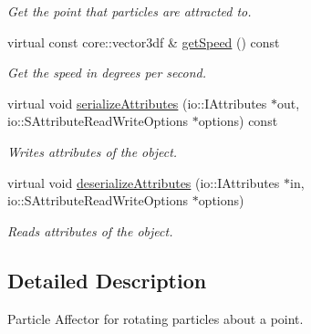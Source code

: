 \begin{DoxyCompactItemize}
\begin{DoxyCompactList}\small\item\em Get the point that particles are attracted to. \end{DoxyCompactList}\item 
\hypertarget{classirr_1_1scene_1_1_c_particle_rotation_affector_ac51ab21cec4c10127ccd55c367d94489}{virtual const core\-::vector3df \& \hyperlink{classirr_1_1scene_1_1_c_particle_rotation_affector_ac51ab21cec4c10127ccd55c367d94489}{get\-Speed} () const }\label{classirr_1_1scene_1_1_c_particle_rotation_affector_ac51ab21cec4c10127ccd55c367d94489}

\begin{DoxyCompactList}\small\item\em Get the speed in degrees per second. \end{DoxyCompactList}\item 
\hypertarget{classirr_1_1scene_1_1_c_particle_rotation_affector_a8244124763ba17bcbc81b1f0e0b49fee}{virtual void \hyperlink{classirr_1_1scene_1_1_c_particle_rotation_affector_a8244124763ba17bcbc81b1f0e0b49fee}{serialize\-Attributes} (io\-::\-I\-Attributes $\ast$out, io\-::\-S\-Attribute\-Read\-Write\-Options $\ast$options) const }\label{classirr_1_1scene_1_1_c_particle_rotation_affector_a8244124763ba17bcbc81b1f0e0b49fee}

\begin{DoxyCompactList}\small\item\em Writes attributes of the object. \end{DoxyCompactList}\item 
\hypertarget{classirr_1_1scene_1_1_c_particle_rotation_affector_aa5590dd4b82741a776c8d2cd639bd53d}{virtual void \hyperlink{classirr_1_1scene_1_1_c_particle_rotation_affector_aa5590dd4b82741a776c8d2cd639bd53d}{deserialize\-Attributes} (io\-::\-I\-Attributes $\ast$in, io\-::\-S\-Attribute\-Read\-Write\-Options $\ast$options)}\label{classirr_1_1scene_1_1_c_particle_rotation_affector_aa5590dd4b82741a776c8d2cd639bd53d}

\begin{DoxyCompactList}\small\item\em Reads attributes of the object. \end{DoxyCompactList}\end{DoxyCompactItemize}


\subsection{Detailed Description}
Particle Affector for rotating particles about a point. 

